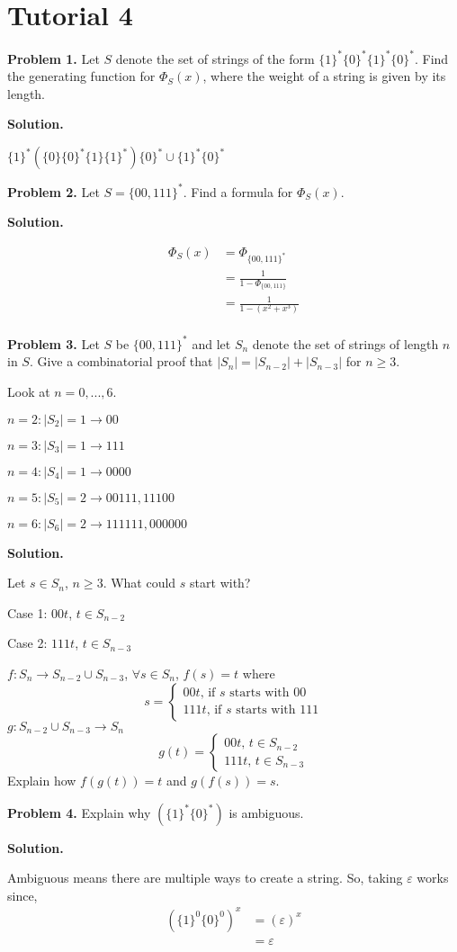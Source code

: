 \section{Tutorial 4}
\textbf{Problem 1.} Let $ S $ denote the set of strings of the form
$ \{1\}^* \{0\}^* \{1\}^* \{0\}^* $. Find the generating function for
$ \Phi_S(x) $, where the weight of a string is given by its length.

\textbf{Solution.}

$ \{1\}^*\left( \{0\}\{0\}^* \{1\}\{1\}^* \right)\{0\}^*\cup \{1\}^* \{0\}^* $

\textbf{Problem 2.} Let $ S=\{00,111\}^* $. Find a formula for
$ \Phi_S(x) $.

\textbf{Solution.}

\begin{align*}
    \Phi_S(x)
    &=\Phi_{\{00,111\}^*}\\
    &=\frac{1}{1-\Phi_{\{00,111\}}}\\
    &=\frac{1}{1-(x^2+x^3)}\\
\end{align*}

\textbf{Problem 3.} Let $ S $ be $ \{00,111\}^* $ and let $ S_n $
denote the set of strings of length $ n $ in $ S $. Give a combinatorial
proof that $ |S_n|=|S_{n-2}|+|S_{n-3}| $ for $ n\geqslant 3 $.

Look at $ n=0,...,6 $.

$ n=2 : |S_2|=1\rightarrow 00 $

$ n=3 : |S_3|=1 \rightarrow 111 $

$ n=4 : |S_4|=1 \rightarrow 0000$

$ n=5 : |S_5|=2 \rightarrow 00111, 11100 $

$ n=6 : |S_6|=2 \rightarrow 111111,000000 $

\textbf{Solution.}

Let $ s\in S_n $, $ n\geqslant 3 $. What could $ s $ start with?

Case 1: $ 00t $, $ t\in S_{n-2} $

Case 2: $ 111t $, $ t\in S_{n-3} $

$ f: S_n\rightarrow S_{n-2}\cup S_{n-3} $, $\forall s\in S_n $, $ f(s)=t $
where
\[ s=
\begin{cases}
    00t,\,\text{if $s$ starts with }00\\
    111t,\,\text{if $s$ starts with }111
\end{cases} \]
$ g:S_{n-2}\cup S_{n-3}\rightarrow S_n $
\[ g(t)=
\begin{cases}
    00t,\,t\in S_{n-2}\\
    111t,\,t\in S_{n-3}
\end{cases} \]
Explain how $ f(g(t))=t $ and $ g(f(s))=s $.

\textbf{Problem 4.} Explain why $ \left( \{1\}^* \{0\}^* \right) $
is ambiguous.

\textbf{Solution.}

Ambiguous means there are multiple ways to create a string. So, taking
$ \varepsilon $ works since,
\begin{align*}
    \left(\{1\}^0\{0\}^0\right)^{x}
    &=(\varepsilon)^{x}\\
    &=\varepsilon
\end{align*}
